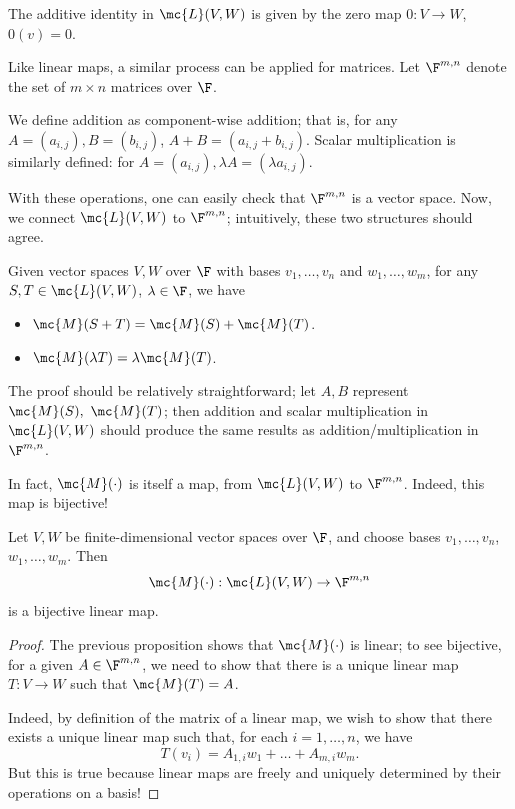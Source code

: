 \documentclass[math0540-lecture-notes.tex]{subfiles}
\begin{document}
The additive identity in $\mc{L}(V,W)$ is given by the zero map $0:V\to W$, $0(v)=0$.

Like linear maps, a similar process can be applied for matrices. Let $\F^{m,n}$ denote the set of
$m\times n$ matrices over $ \F$.
\begin{definition}{}
  We define addition as component-wise addition; that is, for any $A=(a_{i,j}), B=(b_{i,j})$,
  $A+B=(a_{i,j}+b_{i,j})$. Scalar multiplication is similarly defined: for $A=(a_{i,j}), \lambda A =
  (\lambda a_{i,j})$.
\end{definition}
With these operations, one can easily check that $\F^{m,n}$ is a vector space. Now, we connect
$\mc{L}(V,W)$ to $\F^{m,n}$; intuitively, these two structures should agree.
\begin{proposition}[]{} 
  Given vector spaces $V,W$ over $ \F$ with bases $v_1,\ldots,v_n$ and $w_1,\ldots,w_m$, for any
  $S,T\in \mc{L}(V,W)$, $\lambda\in \F$, we have
  \begin{itemize}
    \item $\mc{M}(S+T)=\mc{M}(S)+\mc{M}(T)$.
    \item $\mc{M}(\lambda T)=\lambda\mc{M}(T)$.
  \end{itemize}
\end{proposition}
The proof should be relatively straightforward; let $A,B$ represent $\mc{M}(S),\ \mc{M}(T)$; then
addition and scalar multiplication in $\mc{L}(V,W)$ should produce the same results as
addition/multiplication in $\F^{m,n}$.

In fact, $\mc{M}(\cdot )$ is itself a map, from $\mc{L}(V,W)$ to $\F^{m,n}$. Indeed, this map is
bijective!
\begin{proposition}[]{}
  Let $V,W$ be finite-dimensional vector spaces over $\F$, and choose bases $v_1,\ldots,v_n$, $
  w_1,\ldots,w_m$. Then \[
    \mc{M}(\cdot ): \mc{L}(V,W)\to \F^{m,n}
  \] is a bijective linear map.
\end{proposition}
\begin{proof}[Proof]
  The previous proposition shows that $\mc{M}(\cdot )$ is linear; to see bijective, for a given
  $A\in \F^{m,n}$, we need to show that there is a unique linear map $T:V\to W$ such that
  $\mc{M}(T)=A$.

  Indeed, by definition of the matrix of a linear map, we wish to show that there exists a unique
  linear map such that, for each $i=1,\ldots,n$, we have \[
    T(v_i)=A_{1,i}w_1+\ldots+A_{m,i}w_m
  .\] But this is true because linear maps are freely and uniquely determined by their operations on
  a basis!
\end{proof}
\end{document}

